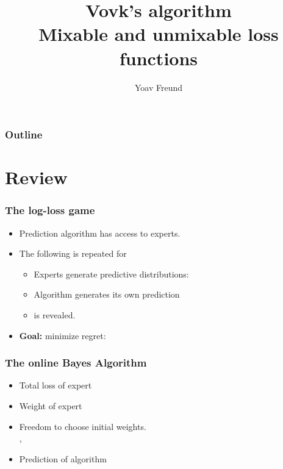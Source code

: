\documentclass[handout]{beamer}
\title [Vovk's algorithm] %
{Vovk's algorithm \\ Mixable and unmixable loss functions}
\author[Freund] %
{Yoav Freund}
\institute[Universities of Somewhere and Elsewhere] %
\begin{document}
%

\begin{frame}
  \titlepage
\end{frame}

\begin{frame}
  \frametitle{Outline}
  \tableofcontents[pausesections]
\end{frame}

\section{Review}

\begin{frame}
\frametitle{The log-loss game}
\begin{itemize}
\item Prediction algorithm  has access to  experts.
\item The following is repeated for 
\begin{itemize}
\item Experts generate predictive distributions: 
\item Algorithm generates its own prediction 
\item {} is revealed.
\end{itemize}
\item {\bf Goal:} minimize regret:
\R{\[
-\sum_{t=1}^T \log p_A^t(c^t) + \min_{i=1,\dots,N} \paren{-\sum_{t=1}^T \log p_i^t(c^t)} 
\]}
\end{itemize}

\end{frame}

\begin{frame}
\frametitle{The online Bayes Algorithm}
\begin{itemize}
\item {\color{blue} Total loss} of expert 
\item {\color{blue}Weight} of expert 
\item
Freedom to choose initial weights.\\
 , 
\item {\color{blue}Prediction} of algorithm 
\R{\[
\vp_A^t = \frac{\sum_{i=1}^N \wt{t}{i} \vp_i^t}{\sum_{i=1}^N \wt{t}{i}}
\]}
\end{itemize}
\end{frame}
\end{document}

